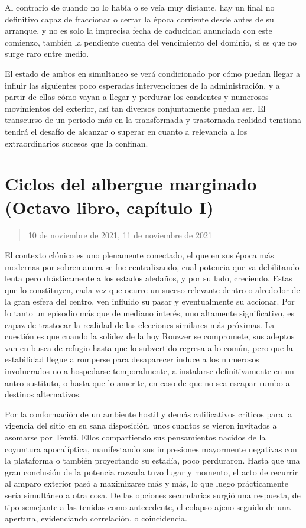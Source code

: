 \documentclass[
]{book}
\begin{document}
Al contrario de cuando no lo había o se veía muy distante, hay un final no definitivo capaz de fraccionar o cerrar la época corriente desde antes de su arranque, y no es solo la imprecisa fecha de caducidad anunciada con este comienzo, también la pendiente cuenta del vencimiento del dominio, si es que no surge raro entre medio.

El estado de ambos en simultaneo se verá condicionado por cómo puedan llegar a influir las siguientes poco esperadas intervenciones de la administración, y a partir de ellas cómo vayan a llegar y perdurar los candentes y numerosos movimientos del exterior, así tan diversos conjuntamente puedan ser. El transcurso de un periodo más en la transformada y trastornada realidad temtiana tendrá el desafío de alcanzar o superar en cuanto a relevancia a los extraordinarios sucesos que la confinan.

\hypertarget{ciclos-del-albergue-marginado-octavo-libro-capuxedtulo-i}{%
\section{Ciclos del albergue marginado (Octavo libro, capítulo I)}\label{ciclos-del-albergue-marginado-octavo-libro-capuxedtulo-i}}

\begin{quote}
10 de noviembre de 2021, 11 de noviembre de 2021
\end{quote}

El contexto clónico es uno plenamente conectado, el que en sus época más modernas por sobremanera se fue centralizando, cual potencia que va debilitando lenta pero drásticamente a los estados aledaños, y por su lado, creciendo. Estas que lo constituyen, cada vez que ocurre un suceso relevante dentro o alrededor de la gran esfera del centro, ven influido su pasar y eventualmente su accionar. Por lo tanto un episodio más que de mediano interés, uno altamente significativo, es capaz de trastocar la realidad de las elecciones similares más próximas. La cuestión es que cuando la solidez de la hoy Rouzzer se compromete, sus adeptos van en busca de refugio hasta que lo subvertido regresa a lo común, pero que la estabilidad llegue a romperse para desaparecer induce a los numerosos involucrados no a hospedarse temporalmente, a instalarse definitivamente en un antro sustituto, o hasta que lo amerite, en caso de que no sea escapar rumbo a destinos alternativos.

Por la conformación de un ambiente hostil y demás calificativos críticos para la vigencia del sitio en su sana disposición, unos cuantos se vieron invitados a asomarse por Temti. Ellos compartiendo sus pensamientos nacidos de la coyuntura apocalíptica, manifestando sus impresiones mayormente negativas con la plataforma o también proyectando su estadía, poco perduraron. Hasta que una gran conclusión de la potencia rozzada tuvo lugar y momento, el acto de recurrir al amparo exterior pasó a maximizarse más y más, lo que luego prácticamente sería simultáneo a otra cosa. De las opciones secundarias surgió una respuesta, de tipo semejante a las tenidas como antecedente, el colapso ajeno seguido de una apertura, evidenciando correlación, o coincidencia.
\end{document}
